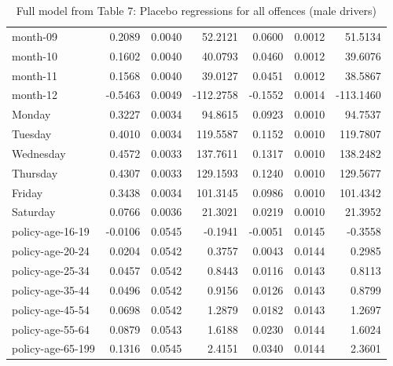 \documentclass[10pt]{article}
\begin{document}
\begin{table}[ht]
\begin{tabular}{lrrrrrr}
  month-09 & 0.2089 & 0.0040 & 52.2121 & 0.0600 & 0.0012 & 51.5134 \\ 
  month-10 & 0.1602 & 0.0040 & 40.0793 & 0.0460 & 0.0012 & 39.6076 \\ 
  month-11 & 0.1568 & 0.0040 & 39.0127 & 0.0451 & 0.0012 & 38.5867 \\ 
  month-12 & -0.5463 & 0.0049 & -112.2758 & -0.1552 & 0.0014 & -113.1460 \\ 
  Monday & 0.3227 & 0.0034 & 94.8615 & 0.0923 & 0.0010 & 94.7537 \\ 
  Tuesday & 0.4010 & 0.0034 & 119.5587 & 0.1152 & 0.0010 & 119.7807 \\ 
  Wednesday & 0.4572 & 0.0033 & 137.7611 & 0.1317 & 0.0010 & 138.2482 \\ 
  Thursday & 0.4307 & 0.0033 & 129.1593 & 0.1240 & 0.0010 & 129.5677 \\ 
  Friday & 0.3438 & 0.0034 & 101.3145 & 0.0986 & 0.0010 & 101.4342 \\ 
  Saturday & 0.0766 & 0.0036 & 21.3021 & 0.0219 & 0.0010 & 21.3952 \\ 
  policy-age-16-19 & -0.0106 & 0.0545 & -0.1941 & -0.0051 & 0.0145 & -0.3558 \\ 
  policy-age-20-24 & 0.0204 & 0.0542 & 0.3757 & 0.0043 & 0.0144 & 0.2985 \\ 
  policy-age-25-34 & 0.0457 & 0.0542 & 0.8443 & 0.0116 & 0.0143 & 0.8113 \\ 
  policy-age-35-44 & 0.0496 & 0.0542 & 0.9156 & 0.0126 & 0.0143 & 0.8799 \\ 
  policy-age-45-54 & 0.0698 & 0.0542 & 1.2879 & 0.0182 & 0.0143 & 1.2697 \\ 
  policy-age-55-64 & 0.0879 & 0.0543 & 1.6188 & 0.0230 & 0.0144 & 1.6024 \\ 
  policy-age-65-199 & 0.1316 & 0.0545 & 2.4151 & 0.0340 & 0.0144 & 2.3601 \\ 
   \hline
\end{tabular}
\caption{Full model from Table 7: Placebo regressions for all offences (male drivers)} 
\label{tab_7_all_pts_M}
\end{table}


\clearpage
\pagebreak



\end{document}
